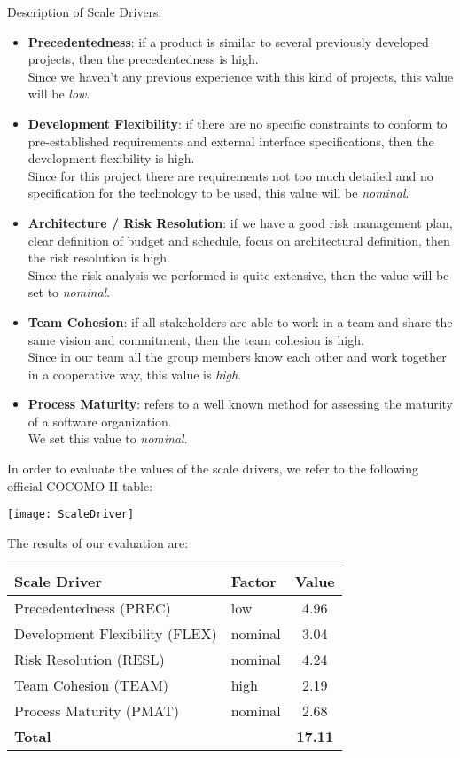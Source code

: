 Description of Scale Drivers:
\begin{itemize}
	\item \textbf{Precedentedness}: if a product is similar to several previously developed projects, then the precedentedness	is high. \\ Since we haven't any previous experience with this kind of projects, this value will be \textit{low}.
	\item \textbf{Development Flexibility}: if there are no specific constraints to conform to pre-established requirements and external interface specifications, then the development flexibility is high. \\ Since for this project there are requirements not too much detailed and no specification for the technology to be used, this value will be \textit{nominal}.
	\item \textbf{Architecture / Risk Resolution}: if we have a good risk management plan, clear definition of budget and schedule, focus on architectural definition, then the risk resolution is high. \\ Since the risk analysis we performed is quite extensive, then the value will be set to \textit{nominal}.
	\item \textbf{Team Cohesion}: if all stakeholders are able to work in a team and share the same vision and commitment, then the team cohesion is high. \\ Since in our team all the group members know each other and work together in a cooperative way, this value is \textit{high}.
	\item \textbf{Process Maturity}: refers to a well known method for assessing the maturity of a software organization. \\ We set this value to \textit{nominal}. 
\end{itemize}

In order to evaluate the values of the scale drivers, we refer to the following official COCOMO II table:
\begin{center}
	\texttt{[image: ScaleDriver]}
\end{center}

The results of our evaluation are:
\begin{center}
	\begin{tabular}{l l c}
		\hline
		\textbf{Scale Driver} & \textbf{Factor} & \textbf{Value} \\
		\hline
		Precedentedness (PREC) & low & 4.96 \\
		Development Flexibility (FLEX) & nominal & 3.04 \\
		Risk Resolution (RESL) & nominal & 4.24 \\
		Team Cohesion (TEAM) & high & 2.19 \\
		Process Maturity (PMAT) & nominal & 2.68 \\
		\hline
		\textbf{Total} & & \textbf{17.11} \\
		\hline
	\end{tabular}
\end{center}


